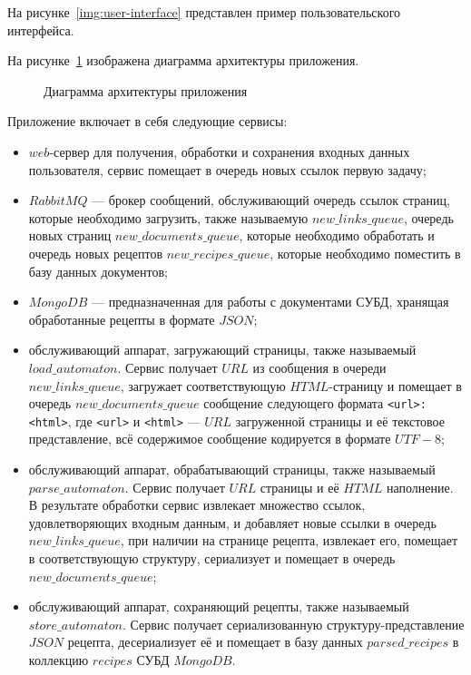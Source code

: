На рисунке~\ref{img:user-interface} представлен пример пользовательского интерфейса.


На рисунке~\ref{img:architecture} изображена диаграмма архитектуры приложения.

\begin{figure}[!ht]
	\center{}
	\caption{Диаграмма архитектуры приложения}
	\label{img:architecture}
\end{figure}

Приложение включает в себя следующие сервисы:
\begin{itemize}
	\item $web$-сервер для получения, обработки и сохранения входных данных пользователя, сервис помещает в очередь новых ссылок первую задачу;
	\item $RabbitMQ$ --- брокер сообщений, обслуживающий очередь ссылок страниц, которые необходимо загрузить, также называемую $new\_links\_queue$, очередь новых страниц $new\_documents\_queue$, которые необходимо обработать и очередь новых рецептов $new\_recipes\_queue$, которые необходимо поместить в базу данных документов;
	\item $MongoDB$ --- предназначенная для работы с документами СУБД, хранящая обработанные рецепты в формате $JSON$;
	\item обслуживающий аппарат, загружающий страницы, также называемый $load\_automaton$. Сервис получает $URL$ из сообщения в очереди $new\_links\_queue$, загружает соответствующую $HTML$-страницу и помещает в очередь $new\_documents\_queue$ сообщение следующего формата \texttt{<url>:<html>}, где \texttt{<url>} и \texttt{<html>} --- $URL$ загруженной страницы и её текстовое представление, всё содержимое сообщение кодируется в формате $UTF-8$;
	\item обслуживающий аппарат, обрабатывающий страницы, также называемый $parse\_automaton$. Сервис получает $URL$ страницы и её $HTML$ наполнение. В результате обработки сервис извлекает множество ссылок, удовлетворяющих входным данным, и добавляет новые ссылки в очередь $new\_links\_queue$, при наличии на странице рецепта, извлекает его, помещает в соответствующую структуру, сериализует и помещает в очередь $new\_documents\_queue$;
	\item обслуживающий аппарат, сохраняющий рецепты, также называемый $store\_automaton$. Сервис получает сериализованную структуру-представление $JSON$ рецепта, десериализует её и помещает в базу данных $parsed\_recipes$ в коллекцию $recipes$ СУБД $MongoDB$.

\end{itemize}
